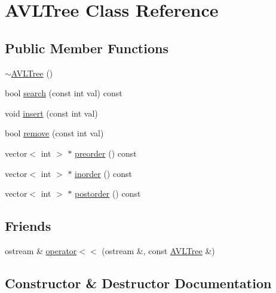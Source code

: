 \hypertarget{classAVLTree}{}\section{A\+V\+L\+Tree Class Reference}
\label{classAVLTree}
\subsection*{Public Member Functions}
\begin{DoxyCompactItemize}
\item 
\mbox{\hyperlink{classAVLTree_af4a1d1be1b6301ba59c6e101c6efc6ba}{$\sim$\+A\+V\+L\+Tree}} ()
\item 
bool \mbox{\hyperlink{classAVLTree_af39c6e1bedbb1a685342d45c5e7b2263}{search}} (const int val) const
\item 
void \mbox{\hyperlink{classAVLTree_aae724d67fd69ce8dec164980d33e7c69}{insert}} (const int val)
\item 
bool \mbox{\hyperlink{classAVLTree_ae128228ecf5727ca598c884c20db0ddc}{remove}} (const int val)
\item 
vector$<$ int $>$ $\ast$ \mbox{\hyperlink{classAVLTree_a722bc2e2f36161ab95f477c4241034f9}{preorder}} () const
\item 
vector$<$ int $>$ $\ast$ \mbox{\hyperlink{classAVLTree_ac6cb3c9545647c06b037df91df935496}{inorder}} () const
\item 
vector$<$ int $>$ $\ast$ \mbox{\hyperlink{classAVLTree_a7d27a3906ddc72ccb8848bd6a310f24e}{postorder}} () const
\end{DoxyCompactItemize}
\subsection*{Friends}
\begin{DoxyCompactItemize}
\item 
ostream \& \mbox{\hyperlink{classAVLTree_a1c2fe2fa878a3a4e7c2315ac417b2721}{operator$<$$<$}} (ostream \&, const \mbox{\hyperlink{classAVLTree}{A\+V\+L\+Tree}} \&)
\end{DoxyCompactItemize}


\subsection{Constructor \& Destructor Documentation}
\mbox{\label{classAVLTree_af4a1d1be1b6301ba59c6e101c6efc6ba}} 
